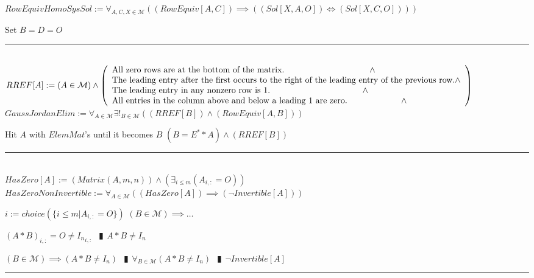 \documentclass{book}
\newcommand{\abr}{:=}
\newcommand{\pipe}{$\phantom{(}\vrectangleblack\phantom{)}$}
\begin{document}
$RowEquivHomoSysSol \abr \forall_{A, C, X \in \mathcal{M}}((RowEquiv[A, C]) \implies ((Sol[X, A, O]) \iff (Sol[X, C, O])))$
\begin{enumerate}
  \lit Set $B = D = O$
\end{enumerate} \vspace{.75mm} \hrule \vspace{.75mm} \ \\ 

$RREF[A] \abr (A \in \mathcal{M}) \land \left(\begin{array}{ll}
  \text{All zero rows are at the bottom of the matrix.} \hfill \land \hfill \\
  \text{The leading entry after the first occurs to the right of the leading entry of the previous row.} \hfill \land \hfill \\
  \text{The leading entry in any nonzero row is 1.} \hfill \land \hfill \\
  \text{All entries in the column above and below a leading 1 are zero.} \hfill \land \hfill \\
\end{array}\right)$ \\

$GaussJordanElim \abr \forall_{A \in \mathcal{M}} \exists!_{B \in \mathcal{M}}((RREF[B]) \land (RowEquiv[A, B]))$
\begin{enumerate}
  \lit Hit $A$ with $ElemMat$'s until it becomes $B$
  \lit $(B = E^* * A) \land (RREF[B])$
\end{enumerate} \vspace{.75mm} \hrule \vspace{.75mm} \ \\ 

$HasZero[A] \abr (Matrix(A, m, n)) \land (\exists_{i \leq m}(A_{i, :} = O))$ \\

$HasZeroNonInvertible \abr \forall_{A \in \mathcal{M}}((HasZero[A]) \implies (\lnot Invertible[A]))$
\begin{enumerate}
  \lit $i \abr choice(\{i \leq m | A_{i, :} = O\})$
  \lit $(B \in \mathcal{M}) \implies \ldots$
  \begin{enumerate}
    \lit $(A * B)_{i, :} = O \neq {I_n}_{i, :}$ \pipe $A * B \neq I_n$
  \end{enumerate}
  \lit $(B \in \mathcal{M}) \implies (A * B \neq I_n)$ \pipe $\forall_{B \in \mathcal{M}}(A * B \neq I_n)$ \pipe $\lnot Invertible[A]$
\end{enumerate} \vspace{.75mm} \hrule \vspace{.75mm} \ \\ 
\end{document}
